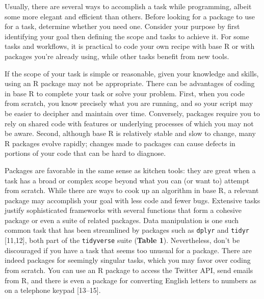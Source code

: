\documentclass[10pt,letterpaper]{article}
\begin{document}
Usually, there are several ways to accomplish a task while programming,
albeit some more elegant and efficient than others. Before looking for a
package to use for a task, determine whether you need one. Consider your
purpose by first identifying your goal then defining the scope and tasks
to achieve it. For some tasks and workflows, it is practical to code
your own recipe with base R or with packages you're already using, while
other tasks benefit from new tools.

If the scope of your task is simple or reasonable, given your knowledge
and skills, using an R package may not be appropriate. There can be
advantages of coding in base R to complete your task or solve your
problem. First, when you code from scratch, you know precisely what you
are running, and so your script may be easier to decipher and maintain
over time. Conversely, packages require you to rely on shared code with
features or underlying processes of which you may not be aware. Second,
although base R is relatively stable and slow to change, many R packages
evolve rapidly; changes made to packages can cause defects in portions
of your code that can be hard to diagnose.

Packages are favorable in the same sense as kitchen tools: they are
great when a task has a broad or complex scope beyond what you can (or
want to) attempt from scratch. While there are ways to cook up an
algorithm in base R, a relevant package may accomplish your goal with
less code and fewer bugs. Extensive tasks justify sophisticated
frameworks with several functions that form a cohesive package or even a
suite of related packages. Data manipulation is one such common task
that has been streamlined by packages such as \texttt{dplyr} and
\texttt{tidyr} {[}11,12{]}, both part of the \texttt{tidyverse} suite
(\textbf{Table 1}). Nevertheless, don't be discouraged if you have a
task that seems too unusual for a package. There are indeed packages for
seemingly singular tasks, which you may favor over coding from scratch.
You can use an R package to access the Twitter API, send emails from R,
and there is even a package for converting English letters to numbers as
on a telephone keypad {[}13--15{]}.
\end{document}

